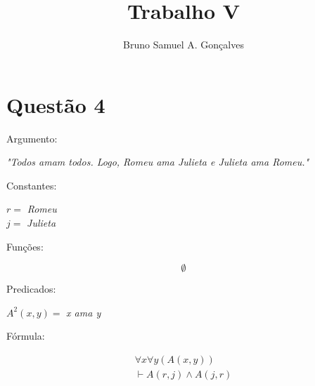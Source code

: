 \documentclass[12pt]{article}
\title{Trabalho V}
\author{Bruno Samuel A. Gonçalves}
\date{}
\begin{document}
\maketitle
\thispagestyle{empty}

\section{Questão 4}

\noindent Argumento:

\begin{center}
    \textit{"Todos amam todos. Logo, Romeu ama Julieta e Julieta ama Romeu."}
\end{center}

\noindent Constantes:

\begin{center}
    $r =$ \textit{Romeu} \\
    $j =$ \textit{Julieta}
\end{center}

\noindent Funções:

\[
    \emptyset
\]

\noindent Predicados:

\begin{center}
    $A^2(x, y) =$ \textit{x ama y}
\end{center}

\noindent Fórmula:

\begin{gather*}
    \forall x \forall y (A(x, y)) \\
    \vdash A(r, j) \land A(j, r)
\end{gather*}
\end{document}
